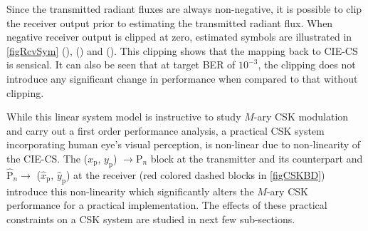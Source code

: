 Since the transmitted radiant fluxes are always non-negative, it is possible to clip the receiver output prior to estimating the transmitted
radiant flux.  When negative receiver output is clipped at zero, estimated
symbols are illustrated in
\figurename{ }\ref{figRcvSym} (),
() and (). This
clipping shows that the mapping back to CIE-CS is sensical. It can also be seen that at target BER of $10^{-3}$, the clipping does not
introduce any significant change in performance when compared to that without clipping.

While this linear system model is instructive to study $M$-ary CSK modulation
and carry out a first order performance analysis, a practical CSK
system incorporating human eye's visual perception, is non-linear due to non-linearity of the CIE-CS. The ($x_{\text{p}}$, $y_{\text{p}}$) $\rightarrow  \text{P}_{n}$ block at the transmitter and its counterpart and $\hat{\text{P}}_{n}\rightarrow$ ($\hat{x}_{\text{p}}$, $\hat{y}_{\text{p}}$) at the receiver (red colored dashed
blocks in \figurename{ }\ref{figCSKBD}) introduce this non-linearity
which significantly alters the $M$-ary CSK performance for a practical
implementation. The effects of these practical constraints on a CSK
system are studied in next few sub-sections.

